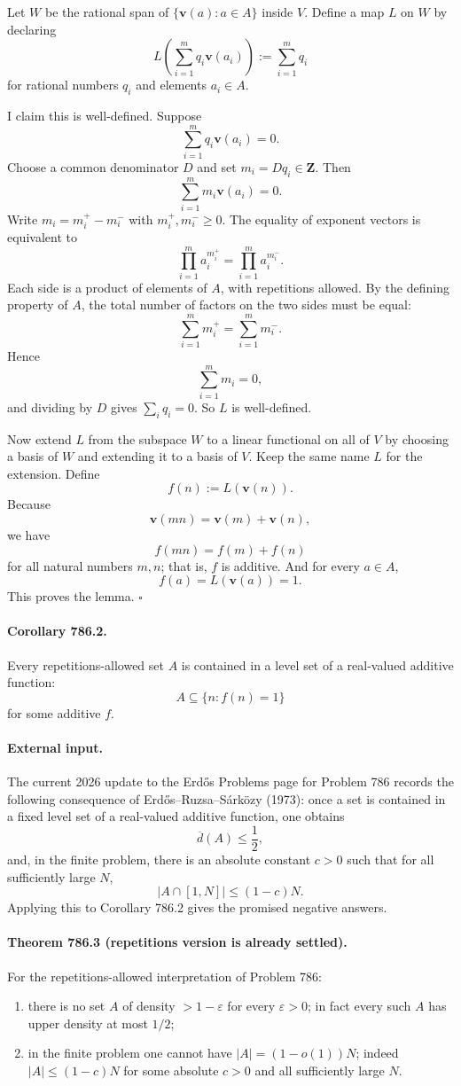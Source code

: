 Let $W$ be the rational span of $\{\mathbf v(a): a \in A\}$ inside $V$. Define a map $L$ on $W$ by declaring
\[
 L\!\left(\sum_{i=1}^m q_i \mathbf v(a_i)\right) := \sum_{i=1}^m q_i
\]
for rational numbers $q_i$ and elements $a_i \in A$.

I claim this is well-defined. Suppose
\[
 \sum_{i=1}^m q_i \mathbf v(a_i)=0.
\]
Choose a common denominator $D$ and set $m_i = D q_i \in \mathbf Z$. Then
\[
 \sum_{i=1}^m m_i \mathbf v(a_i)=0.
\]
Write $m_i = m_i^+ - m_i^-$ with $m_i^+,m_i^- \ge 0$. The equality of exponent vectors is equivalent to
\[
 \prod_{i=1}^m a_i^{m_i^+} = \prod_{i=1}^m a_i^{m_i^-}.
\]
Each side is a product of elements of $A$, with repetitions allowed. By the defining property of $A$, the total number of factors on the two sides must be equal:
\[
 \sum_{i=1}^m m_i^+ = \sum_{i=1}^m m_i^-.
\]
Hence
\[
 \sum_{i=1}^m m_i = 0,
\]
and dividing by $D$ gives $\sum_i q_i = 0$. So $L$ is well-defined.

Now extend $L$ from the subspace $W$ to a linear functional on all of $V$ by choosing a basis of $W$ and extending it to a basis of $V$. Keep the same name $L$ for the extension. Define
\[
 f(n) := L(\mathbf v(n)).
\]
Because
\[
 \mathbf v(mn)=\mathbf v(m)+\mathbf v(n),
\]
we have
\[
 f(mn)=f(m)+f(n)
\]
for all natural numbers $m,n$; that is, $f$ is additive. And for every $a \in A$,
\[
 f(a)=L(\mathbf v(a))=1.
\]
This proves the lemma.
\hfill$\square$

\paragraph{Corollary 786.2.}
Every repetitions-allowed set $A$ is contained in a level set of a real-valued additive function:
\[
 A \subseteq \{n : f(n)=1\}
\]
for some additive $f$.

\paragraph{External input.}
The current 2026 update to the Erd\H{o}s Problems page for Problem 786 records the following consequence of Erd\H{o}s--Ruzsa--S\'ark\"ozy (1973): once a set is contained in a fixed level set of a real-valued additive function, one obtains
\[
 \overline d(A) \le \frac12,
\]
and, in the finite problem, there is an absolute constant $c>0$ such that for all sufficiently large $N$,
\[
 |A \cap [1,N]| \le (1-c)N.
\]
Applying this to Corollary 786.2 gives the promised negative answers.

\paragraph{Theorem 786.3 (repetitions version is already settled).}
For the repetitions-allowed interpretation of Problem 786:
\begin{enumerate}
\item there is no set $A$ of density $>1-\varepsilon$ for every $\varepsilon>0$; in fact every such $A$ has upper density at most $1/2$;
\item in the finite problem one cannot have $|A|=(1-o(1))N$; indeed $|A| \le (1-c)N$ for some absolute $c>0$ and all sufficiently large $N$.
\end{enumerate}

